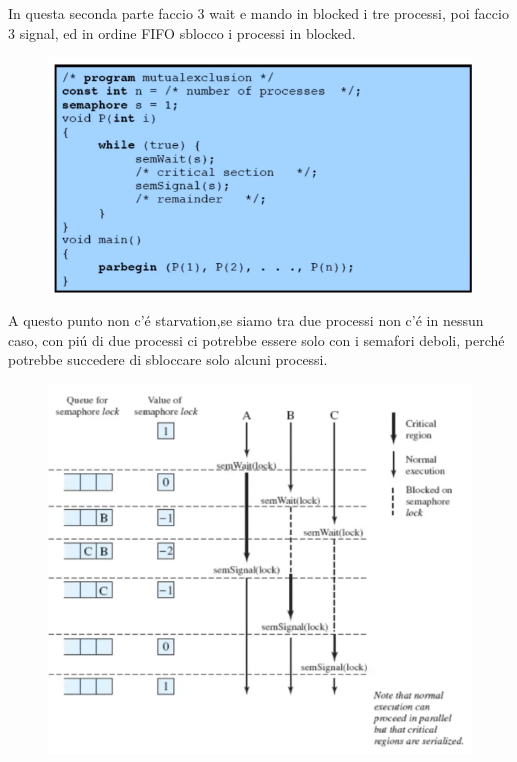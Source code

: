 In questa seconda parte faccio 3 wait e mando in blocked i tre processi, poi faccio 3 signal, ed in ordine FIFO sblocco i
processi in blocked.
\begin{figure}[H]
    \centering
    \includegraphics[width=0.7\linewidth]{immagini/MutuaEsclusioneConSemafori}
\end{figure}
A questo punto non c'é starvation,se siamo tra due processi non c'é in nessun caso, con piú di due processi
ci potrebbe essere solo con i semafori deboli, perché potrebbe succedere di sbloccare solo alcuni processi.
\begin{figure}[H]
    \centering
    \includegraphics[width=0.7\linewidth]{immagini/EsecuzioneSemafori}
\end{figure}

